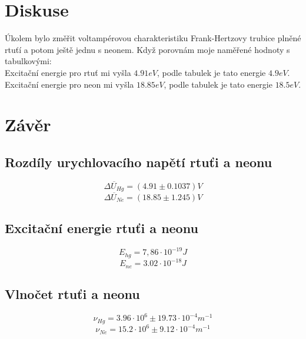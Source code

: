 \documentclass{article}
\begin{document}
\section{Diskuse}
Úkolem bylo změřit voltampérovou charakteristiku Frank-Hertzovy trubice plněné rtuťí a potom ještě
jednu s neonem. Když porovnám moje naměřené hodnoty s tabulkovými: \\
Excitační energie pro rtuť mi vyšla $4.91 eV$, podle tabulek je tato energie $4.9 eV$. \\
Excitační energie pro neon mi vyšla $18.85 eV$, podle tabulek je tato energie $18.5 eV$. \\
\section{Závěr}
\subsection{Rozdíly urychlovacího napětí rtuťi a neonu}
$$\overline{\Delta U_{Hg}} = (4.91 \pm 0.1037) V $$
$$\overline{\Delta U_{Ne}} = (18.85 \pm 1.245) V $$
\subsection{Excitační energie rtuťi a neonu}
$$E_{hg} = 7,86 \cdot 10^{-19} J$$
$$E_{ne} = 3.02 \cdot 10^{-18} J$$
\subsection{Vlnočet rtuťi a neonu}
$$\nu _{Hg} = 3.96 \cdot 10^{6} \pm 19.73 \cdot 10^{-4} m^{-1}$$
$$\nu _{Ne} = 15.2 \cdot 10^{6} \pm 9.12 \cdot 10^{-4} m^{-1}$$
\end{document}
